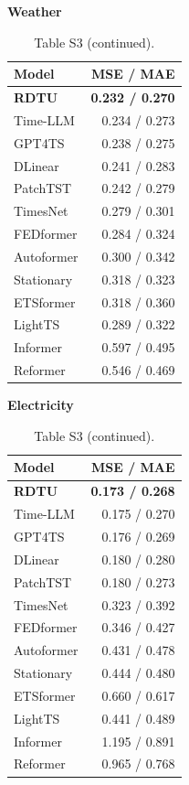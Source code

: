 \begin{table}[H]\centering\small
\caption*{Table S3 (continued).}
\begin{minipage}[t]{0.48\linewidth}\vspace{0pt}\centering\small
\textbf{Weather}\par\smallskip
\begin{tabular}{lr}\toprule Model & MSE / MAE\\\midrule
\rowcolor{blue!5}
\textbf{RDTU} & \textbf{0.232 / 0.270}\\
Time-LLM & 0.234 / 0.273\\
GPT4TS & 0.238 / 0.275\\
DLinear & 0.241 / 0.283\\
PatchTST & 0.242 / 0.279\\
TimesNet & 0.279 / 0.301\\
FEDformer & 0.284 / 0.324\\
Autoformer & 0.300 / 0.342\\
Stationary & 0.318 / 0.323\\
ETSformer & 0.318 / 0.360\\
LightTS & 0.289 / 0.322\\
Informer & 0.597 / 0.495\\
Reformer & 0.546 / 0.469\\
\bottomrule\end{tabular}\end{minipage}\hfill\begin{minipage}[t]{0.48\linewidth}\vspace{0pt}\centering\small
\textbf{Electricity}\par\smallskip
\begin{tabular}{lr}\toprule Model & MSE / MAE\\\midrule
\rowcolor{blue!5}
\textbf{RDTU} & \textbf{0.173 / 0.268}\\
Time-LLM & 0.175 / 0.270\\
GPT4TS & 0.176 / 0.269\\
DLinear & 0.180 / 0.280\\
PatchTST & 0.180 / 0.273\\
TimesNet & 0.323 / 0.392\\
FEDformer & 0.346 / 0.427\\
Autoformer & 0.431 / 0.478\\
Stationary & 0.444 / 0.480\\
ETSformer & 0.660 / 0.617\\
LightTS & 0.441 / 0.489\\
Informer & 1.195 / 0.891\\
Reformer & 0.965 / 0.768\\
\bottomrule\end{tabular}\end{minipage}
\end{table}
